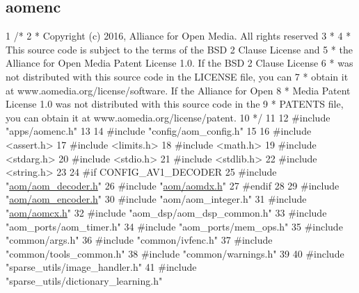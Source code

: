  \hypertarget{example_aomenc}{}\subsection{aomenc}\label{example_aomenc}

\begin{DoxyCodeInclude}
1 \textcolor{comment}{/*}
2 \textcolor{comment}{ * Copyright (c) 2016, Alliance for Open Media. All rights reserved}
3 \textcolor{comment}{ *}
4 \textcolor{comment}{ * This source code is subject to the terms of the BSD 2 Clause License and}
5 \textcolor{comment}{ * the Alliance for Open Media Patent License 1.0. If the BSD 2 Clause License}
6 \textcolor{comment}{ * was not distributed with this source code in the LICENSE file, you can}
7 \textcolor{comment}{ * obtain it at www.aomedia.org/license/software. If the Alliance for Open}
8 \textcolor{comment}{ * Media Patent License 1.0 was not distributed with this source code in the}
9 \textcolor{comment}{ * PATENTS file, you can obtain it at www.aomedia.org/license/patent.}
10 \textcolor{comment}{ */}
11 
12 \textcolor{preprocessor}{#include "apps/aomenc.h"}
13 
14 \textcolor{preprocessor}{#include "config/aom\_config.h"}
15 
16 \textcolor{preprocessor}{#include <assert.h>}
17 \textcolor{preprocessor}{#include <limits.h>}
18 \textcolor{preprocessor}{#include <math.h>}
19 \textcolor{preprocessor}{#include <stdarg.h>}
20 \textcolor{preprocessor}{#include <stdio.h>}
21 \textcolor{preprocessor}{#include <stdlib.h>}
22 \textcolor{preprocessor}{#include <string.h>}
23 
24 \textcolor{preprocessor}{#if CONFIG\_AV1\_DECODER}
25 \textcolor{preprocessor}{#include "\hyperlink{aom__decoder_8h}{aom/aom\_decoder.h}"}
26 \textcolor{preprocessor}{#include "\hyperlink{aomdx_8h}{aom/aomdx.h}"}
27 \textcolor{preprocessor}{#endif}
28 
29 \textcolor{preprocessor}{#include "\hyperlink{aom__encoder_8h}{aom/aom\_encoder.h}"}
30 \textcolor{preprocessor}{#include "aom/aom\_integer.h"}
31 \textcolor{preprocessor}{#include "\hyperlink{aomcx_8h}{aom/aomcx.h}"}
32 \textcolor{preprocessor}{#include "aom\_dsp/aom\_dsp\_common.h"}
33 \textcolor{preprocessor}{#include "aom\_ports/aom\_timer.h"}
34 \textcolor{preprocessor}{#include "aom\_ports/mem\_ops.h"}
35 \textcolor{preprocessor}{#include "common/args.h"}
36 \textcolor{preprocessor}{#include "common/ivfenc.h"}
37 \textcolor{preprocessor}{#include "common/tools\_common.h"}
38 \textcolor{preprocessor}{#include "common/warnings.h"}
39 
40 \textcolor{preprocessor}{#include "sparse\_utils/image\_handler.h"}
41 \textcolor{preprocessor}{#include "sparse\_utils/dictionary\_learning.h"}

\end{DoxyCodeInclude}
